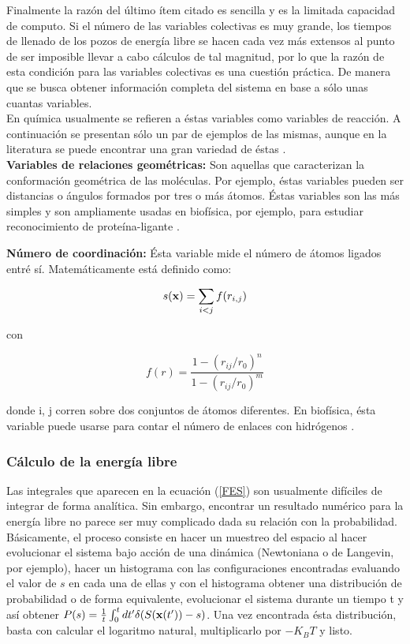 \documentclass [11pt]{article}
\begin{document}
Finalmente la razón del último ítem citado es sencilla y es la limitada capacidad de computo. Si el número de las variables colectivas es muy grande, los tiempos de llenado de los pozos de energía libre se hacen cada vez más extensos al punto de ser imposible llevar a cabo cálculos de tal magnitud, por lo que la razón de esta condición para las variables colectivas es una cuestión práctica. De manera que se busca obtener información completa del sistema en base a sólo unas cuantas variables.\\

En química usualmente se refieren a éstas variables como variables de reacción. A continuación se presentan sólo un par de ejemplos de las mismas, aunque en la literatura se puede encontrar una gran variedad de éstas \cite{fiorin}.\\

{\bf Variables de relaciones geométricas:} Son aquellas que caracterizan la conformación geométrica de las moléculas. Por ejemplo, éstas variables pueden ser distancias o ángulos formados por tres o más átomos. Éstas variables son las más simples y son ampliamente usadas en biofísica, por ejemplo, para estudiar reconocimiento de proteína-ligante \cite{masetti}.

{\bf Número de coordinación:} Ésta variable mide el número de átomos ligados entré sí. Matemáticamente está definido como:

\begin{equation}
    s({\bf x})=\sum_{i<j}f(r_{i,j})
\end{equation}

con 

\begin{equation}
    f(r)=\frac{1-(r_{ij}/r_0)^n}{1-(r_{ij}/r_0)^m}
\end{equation}

donde i, j corren sobre dos conjuntos de átomos diferentes. En biofísica, ésta variable puede usarse para contar el número de enlaces con hidrógenos \cite{bussi}.

\subsubsection{Cálculo de la energía libre}

Las integrales que aparecen en la ecuación (\ref{FES}) son usualmente difíciles de integrar de forma analítica. Sin embargo, encontrar un resultado numérico para la energía libre no parece ser muy complicado dada su relación con la probabilidad. Básicamente, el proceso consiste en hacer un muestreo del espacio al hacer evolucionar el sistema bajo acción de una dinámica (Newtoniana o de Langevin, por ejemplo), hacer un histograma con las configuraciones encontradas evaluando el valor de $s$ en cada una de ellas y con el histograma obtener una distribución de probabilidad o de forma equivalente, evolucionar el sistema durante un tiempo t y así obtener $P(s)=\frac{1}{t}\int_0^tdt' \delta(S({\bf x}(t'))-s)$. Una vez encontrada ésta distribución, basta con calcular el logaritmo natural, multiplicarlo por $-K_BT$ y listo.
\end{document}
